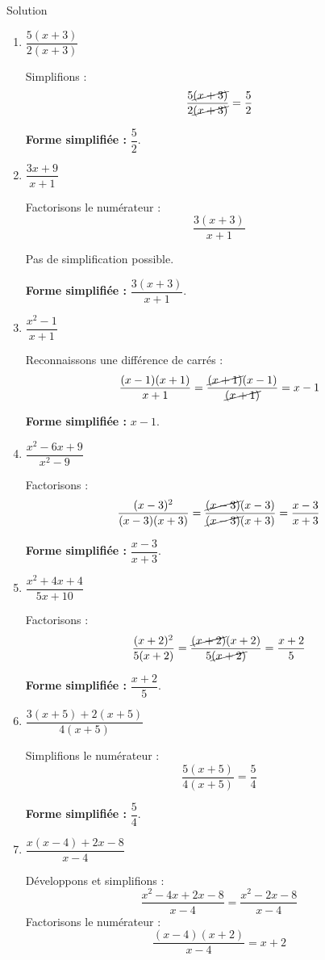 \documentclass[a4paper,12pt]{article}
\begin{document}
\begin{solutionbox}{Solution}
\begin{enumerate}
    \item \( \dfrac{5(x+3)}{2(x+3)} \)

    Simplifions :
    \[
    \dfrac{5\cancel{(x + 3)}}{2\cancel{(x + 3)}} = \dfrac{5}{2}
    \]

    \textbf{Forme simplifiée :} \( \dfrac{5}{2} \).

    \item \( \dfrac{3x+9}{x+1} \)

    Factorisons le numérateur :
    \[
    \dfrac{3(x + 3)}{x + 1}
    \]

    Pas de simplification possible.

    \textbf{Forme simplifiée :} \( \dfrac{3(x + 3)}{x + 1} \).

    \item \( \dfrac{x^2 - 1}{x + 1} \)

    Reconnaissons une différence de carrés :
    \[
    \dfrac{(x - 1)(x + 1)}{x + 1} = \dfrac{\cancel{(x + 1)}(x - 1)}{\cancel{(x + 1)}} = x - 1
    \]

    \textbf{Forme simplifiée :} \( x - 1 \).

    \item \( \dfrac{x^2 - 6x + 9}{x^2 - 9} \)

    Factorisons :
    \[
    \dfrac{(x - 3)^2}{(x - 3)(x + 3)} = \dfrac{\cancel{(x - 3)}(x - 3)}{\cancel{(x - 3)}(x + 3)} = \dfrac{x - 3}{x + 3}
    \]

    \textbf{Forme simplifiée :} \( \dfrac{x - 3}{x + 3} \).

    \item \( \dfrac{x^2 + 4x + 4}{5x + 10} \)

    Factorisons :
    \[
    \dfrac{(x + 2)^2}{5(x + 2)} = \dfrac{\cancel{(x + 2)}(x + 2)}{5\cancel{(x + 2)}} = \dfrac{x + 2}{5}
    \]

    \textbf{Forme simplifiée :} \( \dfrac{x + 2}{5} \).

    \item \( \dfrac{3(x+5) + 2(x+5)}{4(x+5)} \)

    Simplifions le numérateur :
    \[
    \dfrac{5(x + 5)}{4(x + 5)} = \dfrac{5}{4}
    \]

    \textbf{Forme simplifiée :} \( \dfrac{5}{4} \).

    \item \( \dfrac{x(x - 4) + 2x - 8}{x - 4} \)

    Développons et simplifions :
    \[
    \dfrac{x^2 - 4x + 2x - 8}{x - 4} = \dfrac{x^2 - 2x - 8}{x - 4}
    \]
    Factorisons le numérateur :
    \[
    \dfrac{(x - 4)(x + 2)}{x - 4} = x + 2
    \]


\end{enumerate}
\end{solutionbox}
\end{document}
